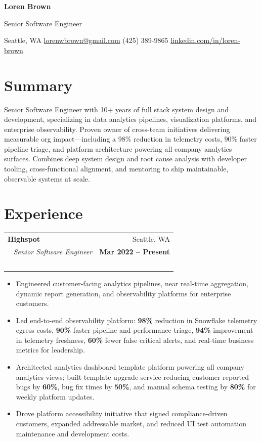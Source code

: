 \documentclass[10pt,letterpaper]{article}
\makeatletter
\newcommand{\contactsep}{\hspace{0.45em}{\color{rulegray}\textbar\hspace{0.45em}}}
\newcommand{\jobblock}[4]{%
  \vspace{0.55em}
  \noindent
  \begin{tabularx}{\textwidth}{@{}X r@{}}  %
    {\bfseries\color{ink}#1} & {\color{muted}\small #2} \\\  %
    {\color{accent}\itshape #3} & {\color{muted}\small\bfseries #4} \\\  %
  \end{tabularx}
  \vspace{0.15em}
}
\makeatother
\begin{document}
\noindent
{\fontsize{26}{30}\selectfont\bfseries\color{ink} Loren Brown}\par
\vspace{0.15em}
{\large\color{accent} Senior Software Engineer}\par
\vspace{0.55em}
{\small\color{muted}
  Seattle, WA
  \contactsep
  \href{mailto:lorenwbrown@gmail.com}{lorenwbrown@gmail.com}
  \contactsep
  (425) 389-9865
  \contactsep
  \href{https://www.linkedin.com/in/loren-brown/}{linkedin.com/in/loren-brown}
}\par
\vspace{0.45em}
\noindent{\color{accentlight}\rule{\textwidth}{3pt}}\par

\section*{Summary}
\noindent
Senior Software Engineer with 10+ years of full stack system design and development,
specializing in data analytics pipelines, visualization platforms, and enterprise
observability. Proven owner of cross-team initiatives delivering measurable org
impact---including a 98\% reduction in telemetry costs, 90\% faster pipeline triage,
and platform architecture powering all company analytics surfaces. Combines deep system
design and root cause analysis with developer tooling, cross-functional alignment, and
mentoring to ship maintainable, observable systems at scale.

\section*{Experience}

\jobblock{Highspot}{Seattle, WA}{Senior Software Engineer}{Mar 2022 -- Present}
\begin{itemize}
  \item Engineered customer-facing analytics pipelines, near real-time aggregation,
    dynamic report generation, and observability platforms for enterprise customers.
  \item Led end-to-end observability platform: \textbf{98\%} reduction in Snowflake
    telemetry egress costs, \textbf{90\%} faster pipeline and performance triage,
    \textbf{94\%} improvement in telemetry freshness, \textbf{60\%} fewer false critical
    alerts, and real-time business metrics for leadership.
  \item Architected analytics dashboard template platform powering all company analytics
    views; built template upgrade service reducing customer-reported bugs by \textbf{60\%},
    bug fix times by \textbf{50\%}, and manual schema testing by \textbf{80\%} for weekly
    platform updates.
  \item Drove platform accessibility initiative that signed compliance-driven customers,
    expanded addressable market, and reduced UI test automation maintenance and
    development costs.
\end{itemize}
\end{document}
